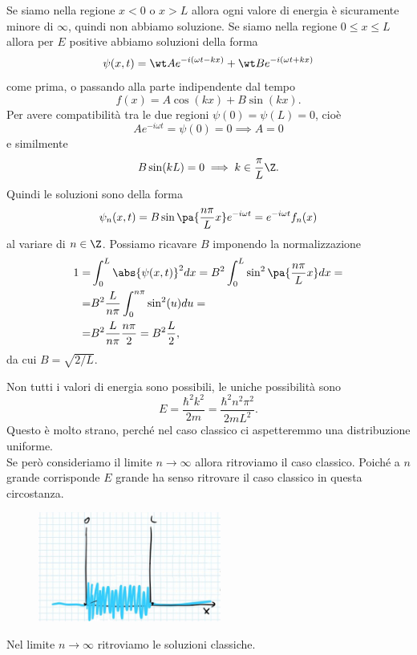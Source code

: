 \noindent
Se siamo nella regione $x<0$ o $x>L$ allora ogni valore di energia \`e sicuramente minore di $\infty$, quindi non abbiamo soluzione. Se siamo nella regione $0\leq x\leq L$ allora per $E$ positive abbiamo soluzioni della forma
\[\psi(x,t)=\wt Ae^{-i(\omega t-kx)}+\wt Be^{-i(\omega t+kx)}\]
come prima, o passando alla parte indipendente dal tempo
\[f(x)=A\cos(kx)+B\sin(kx).\]
Per avere compatibilit\`a tra le due regioni $\psi(0)=\psi(L)=0$, cio\`e
\[Ae^{-i\omega t}=\psi(0)=0\implies A=0\]
e similmente
\[B\sin(kL)=0\implies k\in \frac \pi L\Z.\]
Quindi le soluzioni sono della forma
\[\psi_n(x,t)=B\sin\pa{\frac{n\pi}L x} e^{-i\omega t}=e^{-i\omega t}f_n(x)\]
al variare di $n\in\Z$. Possiamo ricavare $B$ imponendo la normalizzazione
\begin{align*}
1=&\int_0^L\abs{\psi(x,t)}^2dx=B^2\int_0^L\sin^2\pa{\frac{n\pi}L x}dx=\\
=&B^2\frac{L}{n\pi}\int_0^{n\pi} \sin^2(u)du=\\
=&B^2\frac{L}{n\pi}\frac{n\pi}2=B^2\frac L2,
\end{align*}
da cui $B=\sqrt{2/L}$.

\begin{remark}
Non tutti i valori di energia sono possibili, le uniche possibilit\`a sono
\[E=\frac{\hbar^2k^2}{2m}=\frac{\hbar^2n^2\pi^2}{2m L^2}.\]
Questo \`e molto strano, perch\'e nel caso classico ci aspetteremmo una distribuzione uniforme.\\
Se per\`o consideriamo il limite $n\to\infty$ allora ritroviamo il caso classico. Poich\'e a $n$ grande corrisponde $E$ grande ha senso ritrovare il caso classico in questa circostanza.

\begin{figure}[!htb]
    \centering
    \includegraphics[width=6cm]{images/principio_di_corrispondenza.png}
\end{figure}
\end{remark}

\begin{fact}
Nel limite $n\to\infty$ ritroviamo le soluzioni classiche.
\end{fact}

